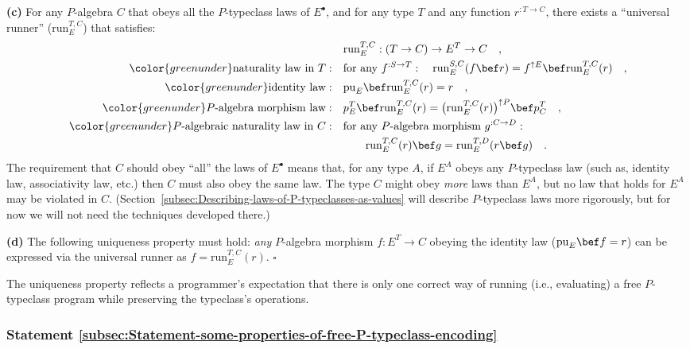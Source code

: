 \textbf{(c)} For any $P$-algebra $C$ that obeys all the $P$-typeclass
laws of $E^{\bullet}$, and for any type $T$ and any function $r^{:T\rightarrow C}$,
there exists a \textsf{``}universal runner\textsf{''} ($\text{run}_{E}^{T,C}$) that
satisfies:
\begin{align}
 & \text{run}_{E}^{T,C}:(T\rightarrow C)\rightarrow E^{T}\rightarrow C\quad,\nonumber \\
{\color{greenunder}\text{naturality law in }T:}\quad & \text{for any }f^{:S\rightarrow T}:\quad\text{run}_{E}^{S,C}(f\bef r)=f^{\uparrow E}\bef\text{run}_{E}^{T,C}(r)\quad,\label{eq:free-typeclass-encoding-naturality-law}\\
{\color{greenunder}\text{identity law}:}\quad & \text{pu}_{E}\bef\text{run}_{E}^{T,C}(r)=r\quad,\label{eq:free-typeclass-encoding-identity-law}\\
{\color{greenunder}P\text{-algebra morphism law}:}\quad & p_{E}^{T}\bef\text{run}_{E}^{T,C}(r)=\big(\text{run}_{E}^{T,C}(r)\big)^{\uparrow P}\bef p_{C}^{T}\quad,\nonumber \\
{\color{greenunder}P\text{-algebraic naturality law in }C:}\quad & \text{for any }P\text{-algebra morphism }g^{:C\rightarrow D}:\nonumber \\
 & \quad\quad\text{run}_{E}^{T,C}(r)\bef g=\text{run}_{E}^{T,D}(r\bef g)\quad.\label{eq:free-typeclass-encoding-P-algebraic-naturality-law}
\end{align}
The requirement that $C$ should obey \textsf{``}all\textsf{''} the laws of $E^{\bullet}$
means that, for any type $A$, if $E^{A}$ obeys any $P$-typeclass
law (such as, identity law, associativity law, etc.) then $C$ must
also obey the same law. The type $C$ might obey \emph{more} laws
than $E^{A}$, but no law that holds for $E^{A}$ may be violated
in $C$. (Section~\ref{subsec:Describing-laws-of-P-typeclasses-as-values}
will describe $P$-typeclass laws more rigorously, but for now we
will not need the techniques developed there.)

\textbf{(d)} The following uniqueness property must hold: \emph{any}
$P$-algebra morphism $f:E^{T}\rightarrow C$ obeying the identity
law ($\text{pu}_{E}\bef f=r$) can be expressed via the universal
runner as $f=\text{run}_{E}^{T,C}(r)$. $\square$

The uniqueness property reflects a programmer\textsf{'}s expectation that there
is only one correct way of running (i.e., evaluating) a free $P$-typeclass
program while preserving the typeclass\textsf{'}s operations.

\subsubsection{Statement \label{subsec:Statement-some-properties-of-free-P-typeclass-encoding}\ref{subsec:Statement-some-properties-of-free-P-typeclass-encoding}}

